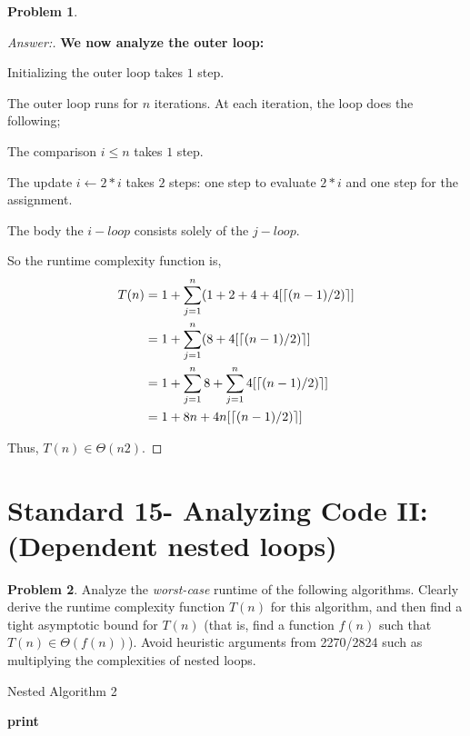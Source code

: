 \documentclass[11pt]{article}
\DeclarePairedDelimiter\ceil{\lceil}{\rceil}
\theoremstyle{definition}
\theoremstyle{definition}
\newtheorem{required}{Problem}
\theoremstyle{definition}
\begin{document}
\begin{required}
\begin{proof}[Answer:]
\item \textbf{We now analyze the outer loop:}
\item Initializing the outer loop takes $1$ step.
\item The outer loop runs for $n$ iterations. At each iteration, the loop does the following;
\item \hspace*{10mm} The comparison $i \leq n$ takes $1$ step.
\item \hspace*{10mm} The update $i \leftarrow 2*i$ takes $2$ steps: one step to evaluate $2*i$ and one step for the assignment.
\item \hspace*{10mm} The body the $i-loop$ consists solely of the $j-loop$.
\item So the runtime complexity function is,
\begin{align*}
T(n) &= 1 + \sum_{j=1}^{n} (1 + 2 + 4 + 4[\ceil*{(n - 1)/2)}] \\
&= 1 + \sum_{j=1}^{n} (8 + 4[\ceil*{(n - 1)/2)}] \\
&=  1 + \sum_{j=1}^{n} 8 + \sum_{j=1}^{n} 4[\ceil*{(n - 1)/2)}] \\
&=  1 + 8n + 4n[\ceil*{(n - 1)/2)}]
\end{align*}

\item Thus, $T(n) \in \Theta(n2)$.

\end{proof}
\end{required}

\newpage
\section{Standard 15- Analyzing Code II: (Dependent nested loops)}
\begin{required}


Analyze the \textit{worst-case} runtime of the following algorithms. Clearly derive the runtime complexity function $T(n)$ for this algorithm, and then find a tight asymptotic bound for $T(n)$ (that is, find a function $f(n)$ such that $T(n) \in \Theta(f(n))$). Avoid heuristic arguments from 2270/2824 such as multiplying the complexities of nested loops.


\begin{algorithm}
\caption{Nested Algorithm 2}\label{alg:NestedDependent1}
\begin{algorithmic}[1]
		\State \textbf{print} 
	\EndFor
\EndFor
\EndProcedure
\end{algorithmic}
\end{algorithm}
\end{required}
\end{document}
